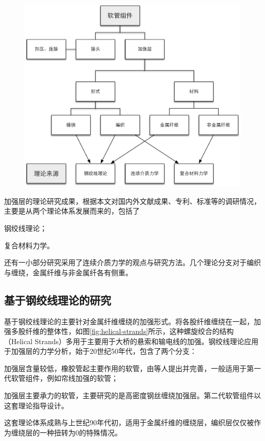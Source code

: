 \begin{figure}[!htbp]
	\centering
	\includegraphics[width=0.7\linewidth]{figure/chap3/理论体系}
	\label{fig:hose-system-theories}
\end{figure}



加强层的理论研究成果，根据本文对国内外文献成果、专利、标准等的调研情况，主要是从两个理论体系发展而来的，包括了
\begin{inparaenum}[1）]
	\item 钢绞线理论；
	\item 复合材料力学。
\end{inparaenum}
还有一小部分研究采用了连续介质力学的观点与研究方法。几个理论分支对于编织与缠绕，金属纤维与非金属纤各有侧重。



\subsection{基于钢绞线理论的研究}

基于钢绞线理论的主要针对金属纤维缠绕的加强形式。将各股纤维缠绕在一起，加强多股纤维的整体性，如图\ref{fig:helical-strands}所示，这种螺旋绞合的结构（Helical Strands）多用于主要用于大桥的悬索和输电线的加强。钢绞线理论应用于加强层的力学分析，始于20世纪50年代，包含了两个分支\cite{Evans2002}：
\begin{inparaenum}[1).]
	\item 加强层含量较低，橡胶管起主要作用的软管，由\citeauthor{Kuipers1989}等人\cite{Kuipers1989,Horn1988}提出并完善，一般适用于第一代软管组件，例如帘线加强的软管；
	\item 加强层主要承力的软管，主要研究的是高密度钢丝缠绕加强层。第二代软管组件以这套理论指导设计。
\end{inparaenum}
这套理论体系成熟与上世纪90年代初，适用于金属纤维的缠绕层，编织层仅仅被作为缠绕层的一种扭转为0的特殊情况\cite{Breig1988}。



